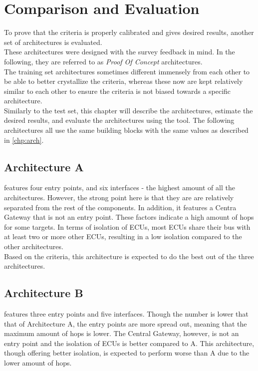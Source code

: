 \chapter{Comparison and Evaluation}
\label{chp:compeval}

To prove that the criteria is properly calibrated and gives desired results, another set of architectures is evaluated.\\
These architectures were designed with the survey feedback in mind.
In the following, they are referred to as \textit{Proof Of Concept} architectures.\\
The training set architectures sometimes different immensely from each other to be able to better crystallize the criteria,
whereas these now are kept relatively similar to each other to ensure the criteria is not biased towards a specific architecture.\\
Similarly to the test set, this chapter will describe the architectures, estimate the desired results, and evaluate the architectures using the tool.
The following architectures all use the same building blocks with the same values as described in \ref{chp:arch}.

\section{Architecture A}
\label{sec:archa}

 features four entry points, and six interfaces - the highest amount of all the architectures.
However, the strong point here is that they are are relatively separated from the rest of the components.
In addition, it features a Centra Gateway that is not an entry point.
These factors indicate a high amount of hops for some targets.
In terms of isolation of ECUs, most ECUs share their bus with at least two or more other ECUs, resulting in a low isolation compared to the other architectures.\\
Based on the criteria, this architecture is expected to do the best out of the three architectures.

\section{Architecture B}
\label{sec:archb}

 features three entry points and five interfaces.
Though the number is lower that that of Architecture A, the entry points are more spread out, meaning that the maximum amount of hops is lower.
The Central Gateway, however, is not an entry point and the isolation of ECUs is better compared to A.
This architecture, though offering better isolation, is expected to perform worse than A due to the lower amount of hops.
